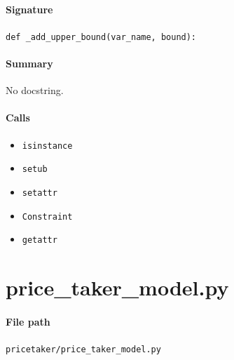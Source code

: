\documentclass[11pt]{report}
\begin{document}
\paragraph{Signature} \texttt{def \_add\_upper\_bound(var\_name, bound):}
\paragraph{Summary} No docstring.
\paragraph{Calls}
\begin{itemize}[leftmargin=*]
  \item \texttt{isinstance}
  \item \texttt{setub}
  \item \texttt{setattr}
  \item \texttt{Constraint}
  \item \texttt{getattr}
\end{itemize}

\section{price\_taker\_model.py}
\label{file:pricetaker-price_taker_model.py}
\paragraph{File path} \texttt{pricetaker/price\_taker\_model.py}
\end{document}

